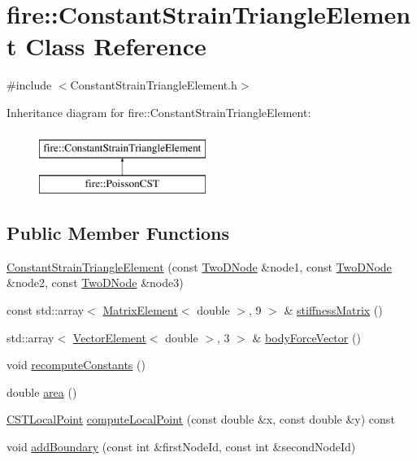 \hypertarget{a00764}{}\section{fire\+:\+:Constant\+Strain\+Triangle\+Element Class Reference}
\label{a00764}


{\ttfamily \#include $<$Constant\+Strain\+Triangle\+Element.\+h$>$}

Inheritance diagram for fire\+:\+:Constant\+Strain\+Triangle\+Element\+:\begin{figure}[H]
\begin{center}
\leavevmode
\includegraphics[height=2.000000cm]{a00764}
\end{center}
\end{figure}
\subsection*{Public Member Functions}
\begin{DoxyCompactItemize}
\item 
\hyperlink{a00764_aa54c09f1dd7cacaf1f4f0b1428859c00}{Constant\+Strain\+Triangle\+Element} (const \hyperlink{a00189_a92dafcc05a788e1065a5792b67f0f70e}{Two\+D\+Node} \&node1, const \hyperlink{a00189_a92dafcc05a788e1065a5792b67f0f70e}{Two\+D\+Node} \&node2, const \hyperlink{a00189_a92dafcc05a788e1065a5792b67f0f70e}{Two\+D\+Node} \&node3)
\item 
const std\+::array$<$ \hyperlink{a00189_a1a12603621e7a1efa59ac5cb79f9d509}{Matrix\+Element}$<$ double $>$, 9 $>$ \& \hyperlink{a00764_a6da0892a84128d73e1186aeb69a37723}{stiffness\+Matrix} ()
\item 
std\+::array$<$ \hyperlink{a00189_a08f01d4bb892cf7b2386d0f3a8643d72}{Vector\+Element}$<$ double $>$, 3 $>$ \& \hyperlink{a00764_ae0795172aa1ee5ffc68ec0e2c4aab9cc}{body\+Force\+Vector} ()
\item 
void \hyperlink{a00764_a40cf9432221b62db76e8b154e3e81e3d}{recompute\+Constants} ()
\item 
double \hyperlink{a00764_acd197716c6bffaa3c7b472661f0e5ca4}{area} ()
\item 
\hyperlink{a00189_a124b14f4255dab47a3f7235a02cc65ee}{C\+S\+T\+Local\+Point} \hyperlink{a00764_a772e106e996b0d757332ca59b9c7f159}{compute\+Local\+Point} (const double \&x, const double \&y) const
\item 
void \hyperlink{a00764_a87952ca08b448d38c7e932f27da499d3}{add\+Boundary} (const int \&first\+Node\+Id, const int \&second\+Node\+Id)
\end{DoxyCompactItemize}
